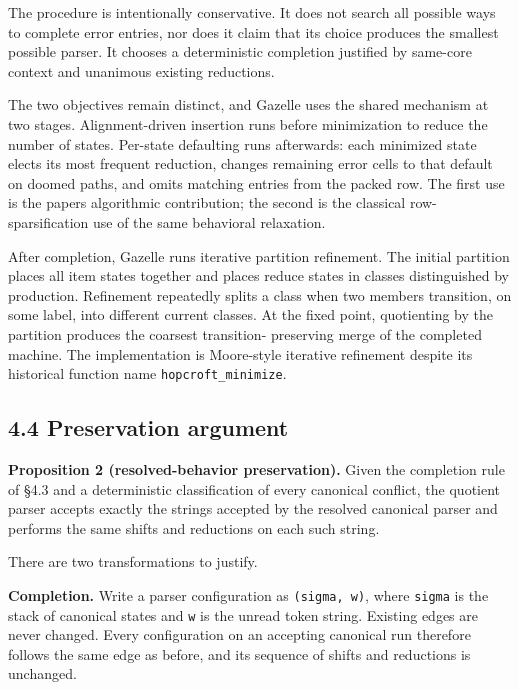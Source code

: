 \documentclass[
  10pt,
]{article}
\begin{document}
The procedure is intentionally conservative. It does not search all
possible ways to complete error entries, nor does it claim that its
choice produces the smallest possible parser. It chooses a deterministic
completion justified by same-core context and unanimous existing
reductions.

The two objectives remain distinct, and Gazelle uses the shared
mechanism at two stages. Alignment-driven insertion runs before
minimization to reduce the number of states. Per-state defaulting runs
afterwards: each minimized state elects its most frequent reduction,
changes remaining error cells to that default on doomed paths, and omits
matching entries from the packed row. The first use is the
paper\textquotesingle s algorithmic contribution; the second is the
classical row-sparsification use of the same behavioral relaxation.

After completion, Gazelle runs iterative partition refinement. The
initial partition places all item states together and places reduce
states in classes distinguished by production. Refinement repeatedly
splits a class when two members transition, on some label, into
different current classes. At the fixed point, quotienting by the
partition produces the coarsest transition- preserving merge of the
completed machine. The implementation is Moore-style iterative
refinement despite its historical function name
\texttt{hopcroft\_minimize}.

\hypertarget{44-preservation-argument}{%
\subsection{4.4 Preservation argument}\label{44-preservation-argument}}

\textbf{Proposition 2 (resolved-behavior preservation).} Given the
completion rule of §4.3 and a deterministic classification of every
canonical conflict, the quotient parser accepts exactly the strings
accepted by the resolved canonical parser and performs the same shifts
and reductions on each such string.

There are two transformations to justify.

\textbf{Completion.} Write a parser configuration as
\texttt{(sigma,\ w)}, where \texttt{sigma} is the stack of canonical
states and \texttt{w} is the unread token string. Existing edges are
never changed. Every configuration on an accepting canonical run
therefore follows the same edge as before, and its sequence of shifts
and reductions is unchanged.
\end{document}

